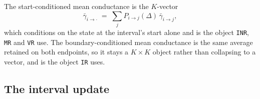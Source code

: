The start-conditioned mean conductance is the $K$-vector
\begin{equation}
  \bar{\gamma}_{i\to\cdot} \;=\; \sum_{j} P_{i\to j}(\Delta)\,\bar{\gamma}_{i\to j},
  \label{eq:gammabar}
\end{equation}
which conditions on the state at the interval's start alone and is the object \texttt{INR},
\texttt{MR} and \texttt{VR} use. The boundary-conditioned mean conductance is the same
average retained on both endpoints, so it stays a $K\times K$ object rather than collapsing
to a vector, and is the object \texttt{IR} uses.

\subsection*{The interval update}

